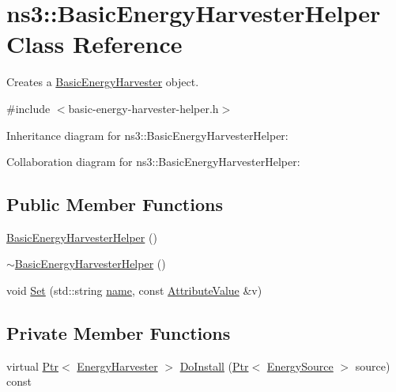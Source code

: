 \hypertarget{classns3_1_1BasicEnergyHarvesterHelper}{}\section{ns3\+:\+:Basic\+Energy\+Harvester\+Helper Class Reference}
\label{classns3_1_1BasicEnergyHarvesterHelper}


Creates a \hyperlink{classns3_1_1BasicEnergyHarvester}{Basic\+Energy\+Harvester} object.  




{\ttfamily \#include $<$basic-\/energy-\/harvester-\/helper.\+h$>$}



Inheritance diagram for ns3\+:\+:Basic\+Energy\+Harvester\+Helper\+:


Collaboration diagram for ns3\+:\+:Basic\+Energy\+Harvester\+Helper\+:
\subsection*{Public Member Functions}
\begin{DoxyCompactItemize}
\item 
\hyperlink{classns3_1_1BasicEnergyHarvesterHelper_ae1de2fae27ec532fbe4b5a5d531bb146}{Basic\+Energy\+Harvester\+Helper} ()
\item 
\hyperlink{classns3_1_1BasicEnergyHarvesterHelper_ac8e0cdb0a5cf0aaf8ab3d43c634c61c0}{$\sim$\+Basic\+Energy\+Harvester\+Helper} ()
\item 
void \hyperlink{classns3_1_1BasicEnergyHarvesterHelper_a7af58efc3f174e0bc3f0be7618da42cb}{Set} (std\+::string \hyperlink{generate__test__data__lte__spectrum__model_8m_ab74e6bf80237ddc4109968cedc58c151}{name}, const \hyperlink{classns3_1_1AttributeValue}{Attribute\+Value} \&v)
\end{DoxyCompactItemize}
\subsection*{Private Member Functions}
\begin{DoxyCompactItemize}
\item 
virtual \hyperlink{classns3_1_1Ptr}{Ptr}$<$ \hyperlink{classns3_1_1EnergyHarvester}{Energy\+Harvester} $>$ \hyperlink{classns3_1_1BasicEnergyHarvesterHelper_a42ace98248e4b698ef6215bbfc6ad1e3}{Do\+Install} (\hyperlink{classns3_1_1Ptr}{Ptr}$<$ \hyperlink{classns3_1_1EnergySource}{Energy\+Source} $>$ source) const 
\end{DoxyCompactItemize}
